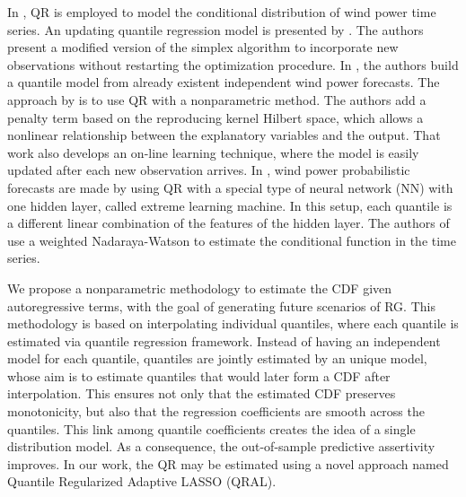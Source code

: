 In \cite{gallego2016line,moller_time-adaptive_2008,nielsen2006,bremnes_probabilistic_2004,wan_direct_2017}, QR is employed to model the conditional distribution of wind power time series.
An updating quantile regression model is presented by \cite{moller_time-adaptive_2008}. The authors present a modified version of the simplex algorithm to incorporate new observations without restarting the optimization procedure.
In \cite{nielsen2006}, the authors build a quantile model from already existent independent wind power forecasts.
The approach by \cite{gallego2016line} is to use QR with a nonparametric method. The authors add a penalty term based on the reproducing kernel Hilbert space, which allows a nonlinear relationship between the explanatory variables and the output. That work also develops an on-line learning technique, where the model is easily updated after each new observation arrives.
In \cite{wan_direct_2017}, wind power probabilistic forecasts are made by using QR with a special type of neural network (NN) with one hidden layer, called extreme learning machine. In this setup, each quantile is a different linear combination of the features of the hidden layer.
The authors of \cite{cai_regression_2002} use a weighted Nadaraya-Watson to estimate the conditional function in the time series.


We propose a nonparametric methodology to estimate the CDF given autoregressive terms, with the goal of generating future scenarios of RG. This methodology is based on interpolating individual quantiles, where each quantile is estimated via quantile regression framework.
Instead of having an independent model for each quantile, quantiles are jointly estimated by an unique model, whose aim is to estimate quantiles that would later form a CDF after interpolation. This ensures not only that the estimated CDF preserves monotonicity, but also that the regression coefficients are smooth across the quantiles. This link among quantile coefficients creates the idea of a single distribution model. As a consequence, the out-of-sample predictive assertivity improves.
In our work, the QR may be estimated using a novel approach named Quantile Regularized Adaptive LASSO (QRAL).


